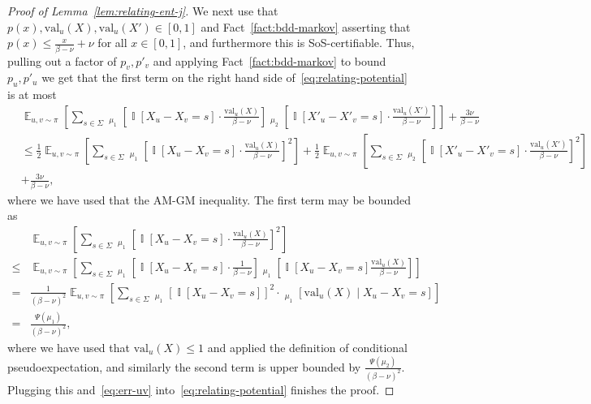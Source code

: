 \documentclass[11pt]{article}
\DeclareMathOperator*{\E}{\mathbb{E}}
\DeclareMathOperator*{\pE}{\widetilde{\mathbb{E}}}
\DeclareMathOperator*{\Ind}{\mathbb{I}}
\def \sos {SoS\xspace}
\def \val {\mathrm{val}}
\theoremstyle{definition}
\begin{document}
\begin{proof}[Proof of Lemma~\ref{lem:relating-ent-j}]
We next use that $p(x),\val_u(X),\val_u(X') \in [0,1]$ and Fact~\ref{fact:bdd-markov} asserting that 
$p(x) \le \frac{x}{\beta-\nu} + \nu$ for all $x \in [0,1]$, and furthermore this is \sos-certifiable.
Thus, pulling out a factor of $p_v,p'_v$ and applying
Fact~\ref{fact:bdd-markov} to bound $p_u,p'_u$ we get 
that the first term on the right hand side of~\eqref{eq:relating-potential} is at most
\begin{align*}
&\E_{u,v\sim \pi}\left[\sum_{s \in \Sigma} \pE_{\mu_1}\left[\Ind[X_u - X_v = s]\cdot \frac{\val_u(X)}{\beta - \nu}\right]\pE_{\mu_{2}}\left[\Ind[X'_u - X'_v = s]\cdot \frac{\val_u(X')}{\beta - \nu}\right]\right] + \frac{3\nu}{\beta-\nu} \\
&\leq \frac{1}{2}\E_{u,v\sim \pi}\left[\sum_{s \in \Sigma} \pE_{\mu_1}\left[\Ind[X_u - X_v = s]\cdot \frac{\val_u(X)}{\beta - \nu}\right]^2\right] + \frac{1}{2}\E_{u,v\sim \pi}\left[\sum_{s \in \Sigma}\pE_{\mu_{2}}\left[\Ind[X'_u - X'_v = s]\cdot \frac{\val_u(X')}{\beta - \nu} \right]^2\right] \\
&+ \frac{3\nu}{\beta-\nu},
\end{align*}
where we have used that the AM-GM inequality. The first term may be bounded as
\begin{align*}
&\E_{u,v\sim \pi}\left[\sum_{s \in \Sigma} \pE_{\mu_1}\left[\Ind[X_u - X_v = s]\cdot \frac{\val_u(X)}{\beta - \nu}\right]^2\right] \nonumber\\
\leq&\E_{u,v\sim \pi}\left[\sum_{s \in \Sigma} \pE_{\mu_1}\left[\Ind[X_u - X_v = s]\cdot \frac{1}{\beta-\nu}\right] \pE_{\mu_1}\left[\Ind[X_u - X_v = s]\frac{\val_u(X)}{\beta - \nu}\right]\right] \nonumber \\
=&\frac{1}{(\beta-\nu)^2}\E_{u,v\sim \pi}\left[ \sum_{s \in \Sigma} \pE_{\mu_1}[\Ind[X_u - X_v = s]]^2 \cdot \pE_{\mu_1}[\val_u(X) \mid X_u - X_v = s] \right]\nonumber\\
=&\frac{\Psi(\mu_1)}{(\beta-\nu)^2},
\end{align*}
where we have used that $\val_u(X) \leq 1$ and applied the definition of conditional pseudoexpectation, 
and similarly the second term is upper bounded by $\frac{\Psi(\mu_{2})}{(\beta-\nu)^2}$. Plugging this and~\eqref{eq:err-uv} into~\eqref{eq:relating-potential} finishes the proof.
\end{proof}

\end{document}
